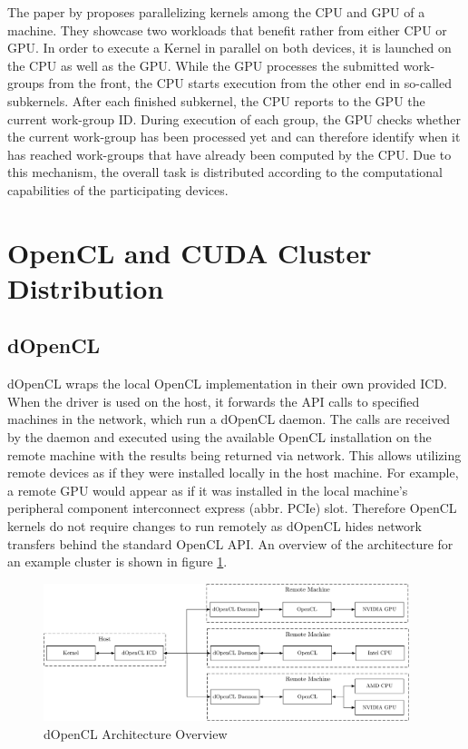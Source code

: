 The paper by \citeauthor{fluidic} proposes parallelizing kernels among the CPU and GPU of a machine\cite{fluidic}. They showcase two workloads that benefit rather from either CPU or GPU. In order to execute a Kernel in parallel on both devices, it is launched on the CPU as well as the GPU. While the GPU processes the submitted work-groups from the front, the CPU starts execution from the other end in so-called subkernels. After each finished subkernel, the CPU reports to the GPU the current work-group ID. During execution of each group, the GPU checks whether the current work-group has been processed yet and can therefore identify when it has reached work-groups that have already been computed by the CPU. Due to this mechanism, the overall task is distributed according to the computational capabilities of the participating devices.


\section{OpenCL and CUDA Cluster Distribution}
\label{cluster_distribution}
\subsection*{dOpenCL}

dOpenCL wraps the local OpenCL implementation in their own provided ICD. When the driver is used on the host, it forwards the API calls to specified machines in the network, which run a dOpenCL daemon\cite{dopencl}. The calls are received by the daemon and executed using the available OpenCL installation on the remote machine with the results being returned via network. This allows utilizing remote devices as if they were installed locally in the host machine. For example, a remote GPU would appear as if it was installed in the local machine's peripheral component interconnect express (abbr. PCIe) slot. Therefore OpenCL kernels do not require changes to run remotely as dOpenCL hides network transfers behind the standard OpenCL API. An overview of the architecture for an example cluster is shown in figure \ref{img:dopencl_arch}.

\begin{figure}[H]

	\includegraphics[width=0.95\textwidth]{drawings/dopencl_arch.pdf}
	\centering
	\caption{dOpenCL Architecture Overview}
	\label{img:dopencl_arch}
\end{figure}

